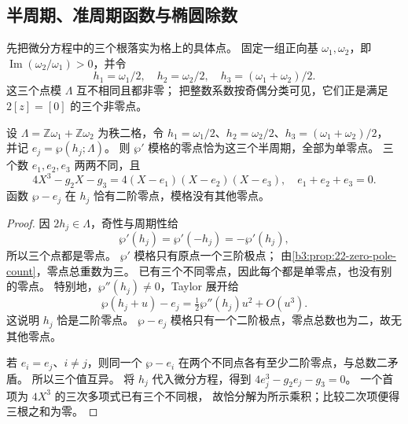 \subsection{半周期、准周期函数与椭圆除数}
\label{b3:subsec:220304}

先把微分方程中的三个根落实为格上的具体点。
固定一组正向基 \(\omega_1,\omega_2\)，即
\(\operatorname{Im}(\omega_2/\omega_1)>0\)，并令
\[
 h_1=\omega_1/2,\quad h_2=\omega_2/2,\quad
 h_3=(\omega_1+\omega_2)/2.
\]
这三个点模 \(\Lambda\) 互不相同且都非零；
把整数系数按奇偶分类可见，它们正是满足 \(2[z]=[0]\) 的三个非零点。

\begin{proposition}[半周期与三个根]\label{b3:prop:22-half-periods}
设 \(\Lambda=\mathbb Z\omega_1+\mathbb Z\omega_2\) 为秩二格，令
\(h_1=\omega_1/2\)、\(h_2=\omega_2/2\)、\(h_3=(\omega_1+\omega_2)/2\)，
并记 \(e_j=\wp(h_j;\Lambda)\)。
则 \(\wp'\) 模格的零点恰为这三个半周期，全部为单零点。
三个数 \(e_1,e_2,e_3\) 两两不同，且
\[
 4X^3-g_2X-g_3=4(X-e_1)(X-e_2)(X-e_3),\quad
 e_1+e_2+e_3=0.
\]
函数 \(\wp-e_j\) 在 \(h_j\) 恰有二阶零点，模格没有其他零点。
\end{proposition}
\begin{proof}
因 \(2h_j\in\Lambda\)，奇性与周期性给
\[
 \wp'(h_j)=\wp'(-h_j)=-\wp'(h_j),
\]
所以三个点都是零点。
\(\wp'\) 模格只有原点一个三阶极点；
由\cref{b3:prop:22-zero-pole-count}，零点总重数为三。
已有三个不同零点，因此每个都是单零点，也没有别的零点。
特别地，\(\wp''(h_j)\ne0\)，Taylor 展开给
\[
 \wp(h_j+u)-e_j=\tfrac12\wp''(h_j)u^2+O(u^3).
\]
这说明 \(h_j\) 恰是二阶零点。
\(\wp-e_j\) 模格只有一个二阶极点，零点总数也为二，故无其他零点。

若 \(e_i=e_j\)、\(i\ne j\)，则同一个 \(\wp-e_i\)
在两个不同点各有至少二阶零点，与总数二矛盾。
所以三个值互异。
将 \(h_j\) 代入微分方程，得到
\(4e_j^3-g_2e_j-g_3=0\)。
一个首项为 \(4X^3\) 的三次多项式已有三个不同根，
故恰分解为所示乘积；比较二次项便得三根之和为零。
\end{proof}

